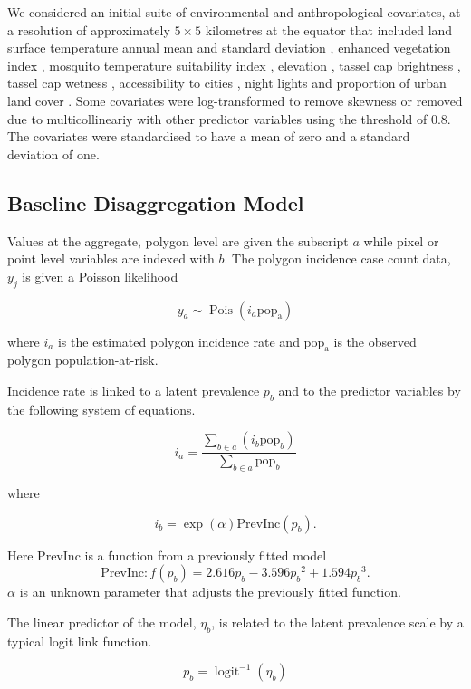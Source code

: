 \documentclass[10pt,letterpaper]{article}
\begin{document}
We considered an initial suite of environmental and anthropological covariates, at a resolution of approximately $5 \times 5$ kilometres at the equator that included land surface temperature annual mean and standard deviation \cite{LST}, enhanced vegetation index \cite{TCB}, mosquito temperature suitability index \cite{weiss2014air}, elevation \cite{SRTMElev}, tassel cap brightness \cite{TCB}, tassel cap wetness \cite{TCB}, accessibility to cities \cite{weiss2018global}, night lights \cite{} and proportion of urban land cover \cite{}. %
Some covariates were log-transformed to remove skewness or removed due to multicollineariy with other predictor variables using the threshold of 0.8. %
The covariates were standardised to have a mean of zero and a standard deviation of one.



\subsection*{Baseline Disaggregation Model}

Values at the aggregate, polygon level are given the subscript $a$ while pixel or point level variables are indexed with $b$.
The polygon incidence case count data, $y_j$ is given a Poisson likelihood

$$y_a \sim \operatorname{Pois}(i_a\mathrm{pop_a})$$

where $i_a$ is the estimated polygon incidence rate and $\mathrm{pop_a}$ is the observed polygon population-at-risk.


Incidence rate is linked to a latent prevalence $p_b$ and to the predictor variables by the following system of equations.

$$i_a = \frac{ \sum_{b \in a}(i_b \mathrm{pop}_b)}{\sum_{b \in a}\mathrm{pop}_b} $$

where

$$i_b = \exp(\alpha)\mathrm{PrevInc}(p_b).$$

Here $\mathrm{PrevInc}$ is a function from a previously fitted model \cite{cameron2015defining} 
$$\mathrm{PrevInc}: f\left(p_b\right) = 2.616p_b - 3.596{p_b}^2 + 1.594{p_b}^3.$$
$\alpha$ is an unknown parameter that adjusts the previously fitted function.

The linear predictor of the model, $\eta_b$, is related to the latent prevalence scale by a typical logit link function.

$$p_b = \operatorname{logit}^{-1}(\eta_b)$$
\end{document}
